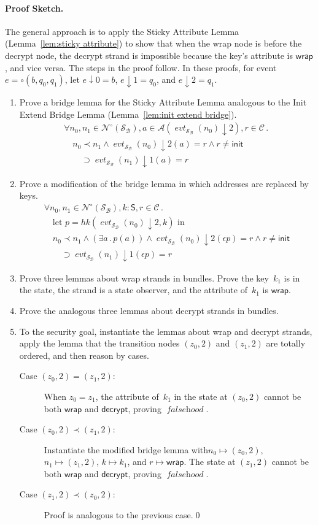 \documentclass[12pt]{article}
\newcommand{\fn}[1]{\ensuremath{\operatorname{\mathit{#1}}}}
\newcommand{\srt}[1]{\ensuremath{\mathsf{#1}}}
\newcommand{\typ}{\mathbin:}
\newcommand{\neutral}{\mathord\circ}
\newcommand{\all}[1]{\forall#1\mathpunct.}
\newcommand{\some}[1]{\exists#1\mathpunct.}
\newcommand{\sel}{\downarrow}
\newcommand{\ssp}{\ensuremath{\mathcal{S}}}
\newcommand{\bun}{\ensuremath{\mathcal{B}}}
\newcommand{\nodes}{\ensuremath{\mathcal{N}}}
\newcommand{\nnodes}{\nodes^{\neutral}}
\newcommand{\evt}{\fn{evt}}
\newcommand{\addr}{\ensuremath{\mathcal{A}}}
\newcommand{\attr}{\ensuremath{\mathcal{C}}}
\newcommand{\ainit}{\ensuremath{\mathsf{init}}}
\newcommand{\awrap}{\ensuremath{\mathsf{wrap}}}
\newcommand{\adecrypt}{\ensuremath{\mathsf{decrypt}}}
\begin{document}
\paragraph{Proof Sketch.}  The general approach is to apply the Sticky
Attribute Lemma (Lemma~\ref{lem:sticky attribute}) to show that when
the wrap node is before the decrypt node, the decrypt strand is
impossible because the key's attribute is \awrap, and vice versa.  The
steps in the proof follow.  In these proofs, for event
$e=\neutral(b,q_0,q_1)$, let $e\sel 0=b$, $e\sel 1=q_0$, and $e\sel
2=q_1$.

\begin{enumerate}
\item Prove a bridge lemma for the Sticky Attribute Lemma analogous to
  the Init Extend Bridge Lemma (Lemma~\ref{lem:init extend bridge}).
\[
\begin{array}{l}
\all{n_0,n_1\in\nnodes(\ssp_\bun),a\in\addr
  (\evt_{\ssp_\bun}(n_0)\sel 2),r\in\attr}\\
\quad n_0\prec n_1\land\evt_{\ssp_\bun}(n_0)\sel 2(a)=r\land
r\neq\ainit \\
\qquad{}\supset\evt_{\ssp_\bun}(n_1)\sel 1(a)=r
\end{array}
\]
\item Prove a modification of the bridge lemma in which addresses are
  replaced by keys.
\[
\begin{array}{l}
\all{n_0,n_1\in\nnodes(\ssp_\bun),k\typ\srt{S},r\in\attr}\\
\quad\mbox{let }p=hk(\evt_{\ssp_\bun}(n_0)\sel 2,k)\mbox{ in}\\
\quad n_0\prec n_1\land(\some{a}p(a))\land
\evt_{\ssp_\bun}(n_0)\sel 2(\epsilon p)=r\land
r\neq\ainit \\
\qquad{}\supset\evt_{\ssp_\bun}(n_1)\sel 1(\epsilon p)=r
\end{array}
\]
\item Prove three lemmas about wrap strands in bundles.  Prove the
  key~$k_1$ is in the state, the strand is a state observer, and the
  attribute of~$k_1$ is \awrap.
\item Prove the analogous three lemmas about decrypt strands in bundles.
\item To the security goal, instantiate the lemmas about wrap and
  decrypt strands, apply the lemma that the transition nodes $(z_0,2)$
  and $(z_1,2)$ are totally ordered, and then reason by cases.
  \begin{description}
    \item[Case $(z_0,2)=(z_1,2)$:] When $z_0=z_1$, the attribute
      of~$k_1$ in the state at $(z_0,2)$ cannot be both {\awrap} and
      {\adecrypt}, proving \fn{falsehood}.
    \item[Case $(z_0,2)\prec(z_1,2)$:] Instantiate the modified bridge
      lemma with\break$n_0\mapsto(z_0,2)$, $n_1\mapsto(z_1,2)$, $k\mapsto
      k_1$, and $r\mapsto\awrap$.  The state at $(z_1,2)$ cannot be
      both {\awrap} and {\adecrypt}, proving \fn{falsehood}.
    \item[Case $(z_1,2)\prec(z_0,2)$:] Proof is analogous to the
      previous case.\qed
  \end{description}
\end{enumerate}
\end{document}
